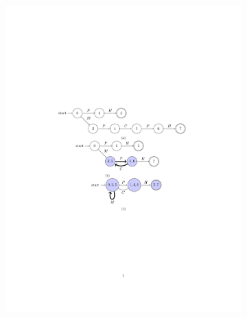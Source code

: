\documentclass[letterpaper, 11 pt, onecolumn]{article}
\begin{document}
\begin{figure}[t!]
\begin{subfigure}[b]{0.3\textwidth}
\includegraphics[width=\textwidth]{fig/merge1.pdf}         \caption{}
    \end{subfigure}%
    \begin{subfigure}[b]{0.28\textwidth}
        \centering

\end{subfigure}
\end{figure}
\end{document}

